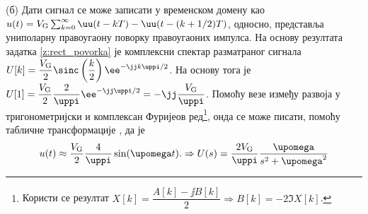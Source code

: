 (б) Дати сигнал се може записати у временском домену као 
$u(t) = V_{\rm G} \sum_{k = 0}^{\infty} \uu(t - kT) - \uu(t - (k+1/2)T)$, односно, представља униполарну правоугаону поворку 
правоугаоних импулса. 
На основу резултата задатка \ref{z:rect_povorka} је комплексни спектар разматраног сигнала
$U[k] = \dfrac{V_{\rm G}}{2} \sinc\left(\dfrac{k}{2}\right) \ee^{-\jj k \uppi / 2 } $.
На основу тога је
$U[1] = \dfrac{V_{\rm G}}{2} \dfrac{2}{\uppi} \ee^{-\jj\uppi/2} = - \jj \dfrac{V_{\rm G}}{\uppi}$.
Помоћу везе између развоја у тригонометријски и комплексан Фуријеов ред\footnote{Користи се 
резултат $X[k] = \dfrac{A[k] - \jj B[k]}{2} \Rightarrow B[k] = -2 \Im{X[k]}$.
}, онда се може писати, помоћу табличне трансформације , да је 
\begin{equation}
    u(t) \approx \dfrac{V_{\rm G}}{2}  
    \dfrac{4}{\uppi} \sin(\upomega t) .
    \Rightarrow
    U(s) = 
    \dfrac{2 V_{\rm G}}{\uppi}
    \dfrac{\upomega }{s^2 + \upomega^2}
\end{equation}

